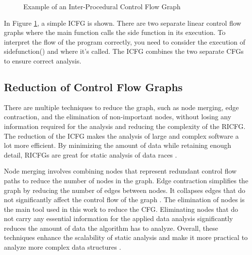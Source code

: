 \documentclass[
fancyheadings, %
%
%
]{stsreprt}
\begin{document}
{\begin{figure}[H]
			\caption{Example of an Inter-Procedural Control Flow Graph}
			\label{icfg}
		\end{figure}
		
		In Figure \ref{icfg}, a simple \ac{ICFG} is shown. There are two separate linear control flow graphs where the main function calls the side function in its execution. To interpret the flow of the program correctly, you need to consider the execution of sidefunction() and where it's called. The ICFG combines the two separate CFGs to ensure correct analysis.
		
		\subsection{Reduction of Control Flow Graphs}
		There are multiple techniques to reduce the graph, such as node merging, edge contraction, and the elimination of non-important nodes, without losing any information required for the analysis and reducing the complexity of the RICFG. The reduction of the ICFG makes the analysis of large and complex software a lot more efficient. By minimizing the amount of data while retaining enough detail, RICFGs are great for static analysis of data races \cite{wang2020}.
		
		Node merging involves combining nodes that represent redundant control flow paths to reduce the number of nodes in the graph. Edge contraction simplifies the graph by reducing the number of edges between nodes. It collapses edges that do not significantly affect the control flow of the graph \cite{muchnick1997}. The elimination of nodes is the main tool used in this work to reduce the CFG. Eliminating nodes that do not carry any essential information for the applied data analysis significantly reduces the amount of data the algorithm has to analyze. Overall, these techniques enhance the scalability of static analysis and make it more practical to analyze more complex data structures \cite{wang2020}.
		
}
\end{document}
